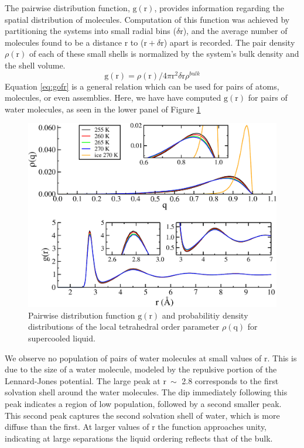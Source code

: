 The pairwise distribution function, $\mathrm{g}(\mathrm{r})$, provides
information regarding the spatial distribution of
molecules. Computation of this function was achieved by partitioning
the systems into small radial bins ($\delta \mathrm{r}$), and the
average number of molecules found to be a distance $\mathrm{r}$ to
($\mathrm{r} + \delta \mathrm{r}$) apart is recorded. The pair density
$\rho (\mathrm{r})$ of each of these small shells is normalized by the
system's bulk density and the shell volume.
\begin{equation}\label{eq:gofr}
\mathrm{g}(\mathrm{r}) = \rho(\mathrm{r}) / 4\pi \mathrm{r}^2 \delta \mathrm{r} \rho^{bulk}
\end{equation}
Equation \eqref{eq:gofr} is a general relation which can be used for
pairs of atoms, molecules, or even assemblies. Here, we have have
computed $\mathrm{g}(\mathrm{r})$ for pairs of water molecules, as
seen in the lower panel of Figure \ref{fig:gofrQ}

\begin{figure}
\includegraphics[width=\linewidth]{Figures/bulk_GofrQdens}
\caption{\label{fig:gofrQ} Pairwise distribution function
  $\mathrm{g}(\mathrm{r})$ and probabilitiy density distributions of
  the local tetrahedral order parameter $\rho (\mathrm{q})$ for
  supercooled liquid.}
\end{figure}  

We observe no population of pairs of water molecules at small values
of $\mathrm{r}$. This is due to the size of a water molecule, modeled
by the repulsive portion of the Lennard-Jones potential. The large
peak at $\mathrm{r}~\sim$ 2.8 corresponds to the first solvation
shell around the water molecules. The dip immediately following this
peak indicates a region of low population, followed by a second
smaller peak. This second peak captures the second solvation shell of
water, which is more diffuse than the first. At larger values of
$\mathrm{r}$ the function approaches unity, indicating at large
separations the liquid ordering reflects that of the bulk. 

